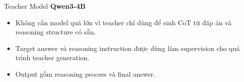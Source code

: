 \begin{frame}
    \vspace{0.35cm}

    \begin{block}{Teacher Model}
        \centering
        \textbf{Qwen3-4B}
    \end{block}

    \vspace{0.15cm}

    \begin{itemize}
        \item Không cần model quá lớn vì teacher chỉ dùng để
        sinh CoT từ đáp án và reasoning structure có sẵn.

        \item Target answer và reasoning instruction được dùng
        làm supervision cho quá trình teacher generation.

        \item Output gồm reasoning process và final answer.
    \end{itemize}

\end{frame}



